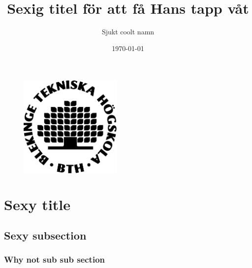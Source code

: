 \documentclass[a4paper]{article}
\title{Sexig titel för att få Hans tapp våt}
\author{Sjukt coolt namn}
\date{\today}
\begin{document}
\maketitle
\begin{figure}
\center
\includegraphics[width=5cm]{bth_logo.jpg}
\end{figure}
\pagebreak

\tableofcontents

\pagebreak

\section{Sexy title} %

\lipsum %

\subsection{Sexy subsection} %

\lipsum %

\subsubsection{Why not sub sub section} %

\lipsum %
\end{document}
